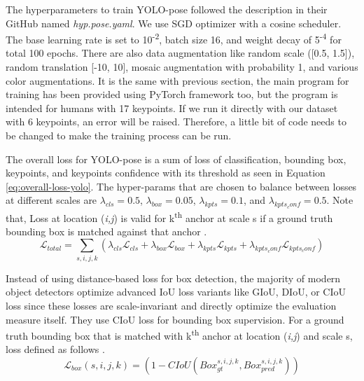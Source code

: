 



The hyperparameters to train YOLO-pose followed the description in their GitHub named \emph{hyp.pose.yaml}.
We use SGD optimizer with a cosine scheduler. The base learning rate is set to 10\textsuperscript{-2}, batch size 16,
and weight decay of 5\textsuperscript{-4} for total 100 epochs. There are also data augmentation like random scale ([0.5, 1.5]),
random translation [-10, 10], mosaic augmentation with probability 1, and various color augmentations.
It is the same with previous section, the main program for training has been provided using PyTorch framework too, but the program is intended for humans with 17 keypoints.
If we run it directly with our dataset with 6 keypoints, an error will be raised. Therefore, a little bit of code needs to be changed to make the training process can be run.

The overall loss for YOLO-pose is a sum of loss of classification, bounding box, keypoints, and keypoints confidence with its threshold as seen in Equation \ref{eq:overall-loss-yolo}.
The hyper-params that are chosen to balance between losses at different scales are $\lambda_{cls} = 0.5$, $\lambda_{box} = 0.05$, $\lambda_{kpts} = 0.1$, and $\lambda_{kpts_conf} = 0.5$.
Note that, Loss at location (\emph{i,j}) is valid for k\textsuperscript{th} anchor at scale s if a ground truth bounding box is matched against that anchor \parencite{maji2022yolopose}.
\begin{equation}
  \label{eq:overall-loss-yolo}
  \mathcal{L}_{total} = \sum_{s,i,j,k} (\lambda_{cls}\mathcal{L}_{cls} + \lambda_{box}\mathcal{L}_{box} + \lambda_{kpts}\mathcal{L}_{kpts} + \lambda_{kpts_conf}\mathcal{L}_{kpts_conf})
\end{equation}

Instead of using distance-based loss for box detection, the majority of modern object detectors optimize advanced IoU loss variants like GIoU, DIoU, or CIoU loss since these losses are scale-invariant and directly optimize the evaluation measure itself.
They use CIoU loss for bounding box supervision. For a ground truth bounding box that is matched with k\textsuperscript{th} anchor at location (\emph{i,j}) and scale s, loss defined as follows \parencite{maji2022yolopose}.
\begin{equation}
  \label{eq:bbox-loss-yolo}
  \mathcal{L}_{box}(s,i,j,k) = (1 - CIoU(Box_{gt}^{s,i,j,k}, Box_{pred}^{s,i,j,k}))
\end{equation}

